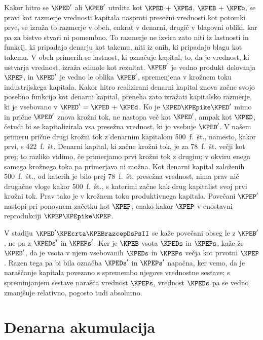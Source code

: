\documentclass[kapital_02.tex]{subfiles}
\begin{document}
Kakor hitro se \( \KPED' \) ali \( \KPEB' \) utrdita kot \( \KPED \textrm{ + } \KPEd \), \( \KPEB \textrm{ + } \KPEb \), se pravi kot razmerje vrednosti kapitala nasproti presežni vrednosti kot potomki prve, se izraža to razmerje v obeh, enkrat \KPEstran v denarni, drugič v blagovni obliki, kar pa za bistvo stvari ni pomembno. To razmerje ne izvira zato niti iz lastnosti in funkcij, ki pripadajo denarju kot takemu, niti iz onih, ki pripadajo blagu kot takemu. V obeh primerih se lastnost, ki označuje kapital, to, da je vrednost, ki ustvarja vrednost, izraža edinole kot rezultat. \( \KPEB' \) je vedno produkt delovanja \( \KPEP \), in \( \KPED' \) je vedno le oblika \( \KPEB' \), spremenjena v krožnem toku industrijskega kapitala. Kakor hitro realizirani denarni kapital znova začne svojo posebno funkcijo kot denarni kapital, preneha zato izražati kapitalsko razmerje, ki je vsebovano v \( \KPED' \textrm{ = } \KPED \textrm{ + } \KPEd \). Ko je \( \KPED \KPEpike \KPED' \) mimo in prične \( \KPED' \) znova krožni tok, ne nastopa več kot \( \KPED' \), ampak kot \( \KPED \), četudi bi se kapitalizirala vsa presežna vrednost, ki jo vsebuje \( \KPED' \). V našem primeru prične drugi krožni tok z denarnim kapitalom 500\ f.\ št., namesto, kakor prvi, s 422\ f.\ št. Denarni kapital, ki začne krožni tok, je za 78\ f.\ št. večji kot prej; to razliko vidimo, če primerjamo prvi krožni tok z drugim; v okviru enega samega krožnega toka pa primerjava ni možna. Kot denarni kapital založenih 500\ f.\ št., od katerih je bilo prej 78\ f.\ št. presežna vrednost, nima prav nič drugačne vloge kakor 500\ f.\ št., s katerimi začne kak drug kapitalist svoj prvi krožni tok. Prav tako je v krožnem toku produktivnega kapitala. Povečani \( \KPEP' \) nastopi pri ponovnem začetku kot \( \KPEP \), enako kakor \( \KPEP \) v enostavni reprodukciji \( \KPEP \KPEpike \KPEP \).

V stadiju \( \KPED' \KPEcrta \KPEBrazcepDsPsII \) se kaže povečani obseg le z \( \KPEB' \), ne pa z \( \KPEDs' \) in \( \KPEPs' \). Ker je \( \KPEB \) vsota \( \KPEDs \) in \( \KPEPs \), kaže že \( \KPEB' \), da je vsota v njem vsebovanih \( \KPEDs \) in \( \KPEPs \) večja kot prvotni \( \KPEP \). Razen tega pa bi bila označba \( \KPEDs' \) in \( \KPEPs' \) napačna, ker vemo, da je naraščanje kapitala povezano s spremembo njegove vrednostne sestave; s spreminjanjem sestave narašča vrednost \( \KPEPs \), vrednost \( \KPEDs \) pa se vedno zmanjšuje relativno, pogosto tudi absolutno.

\section{Denarna akumulacija}
\end{document}
